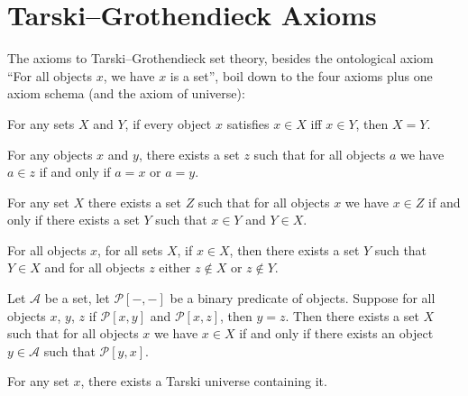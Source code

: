\section{Tarski--Grothendieck Axioms}

\begin{node}[Axioms]\label{tg-0003}%
The axioms to Tarski--Grothendieck set theory, besides the ontological
axiom ``For all objects $x$, we have $x$ is a set'', boil down to the
four axioms plus one axiom schema (and the axiom of universe):

\begin{node}\label{tg-0004}%
For any sets $X$ and $Y$, if every object $x$ satisfies $x\in X$ iff
$x\in Y$, then $X=Y$.
\end{node}

\begin{node}\label{tg-0005}%
For any objects $x$ and $y$, there exists a set $z$ such that for all
objects $a$ we have $a\in z$ if and only if $a=x$ or $a=y$.
\end{node}

\begin{node}\label{tg-0006}%
For any set $X$ there exists a set $Z$ such that for all objects $x$ we
have $x\in Z$ if and only if there exists a set $Y$ such that $x\in Y$
and $Y\in X$.
\end{node}

\begin{node}\label{tg-0007}%
For all objects $x$, for all sets $X$, if $x\in X$, then there exists a
set $Y$ such that $Y\in X$ and for all objects $z$ either $z\notin X$ or
$z\notin Y$.
\end{node}

\begin{node}\label{tg-0008}%
Let $\mathcal{A}$ be a set, let $\mathcal{P}[-,-]$ be a binary predicate
of objects. Suppose for all objects $x$, $y$, $z$ if $\mathcal{P}[x,y]$ and
$\mathcal{P}[x,z]$, then $y=z$.
Then there exists a set $X$ such that for all objects $x$ we have $x\in X$
if and only if there exists an object $y\in\mathcal{A}$ such that $\mathcal{P}[y,x]$.
\end{node}

\begin{node}\label{tg-0009}%
For any set $x$, there exists a Tarski universe containing it.
\end{node}
\end{node}

